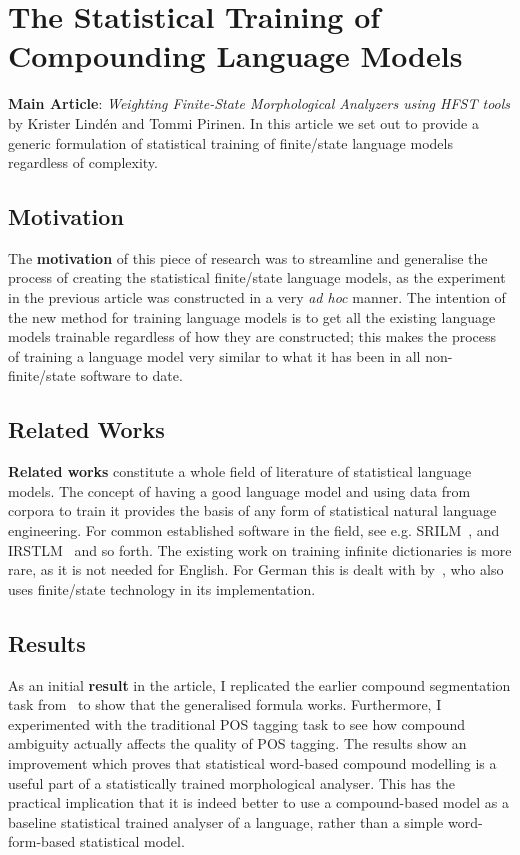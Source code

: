 \documentclass[officiallayout,final]{unihelcompling}
\begin{document}
\section{The Statistical Training of Compounding Language Models}
\label{sec:training-compounds}

\textbf{Main Article}: \emph{Weighting Finite-State Morphological Analyzers
using HFST tools} by Krister Lindén and Tommi Pirinen. In this article we set out
to provide a generic formulation of statistical training of finite\-/state
language models regardless of complexity.

\subsection{Motivation}

The \textbf{motivation} of this piece of research was to streamline and
generalise the process of creating the statistical finite\-/state language
models, as the experiment in the previous article
 was constructed in a very \emph{ad hoc}
manner. The intention of the new method for training language models is to get
all the existing language models trainable regardless of how they are
constructed; this makes the process of training a language model very similar
to what it has been in all non-finite\-/state software to date.

\subsection{Related Works}

\textbf{Related works} constitute a whole field of literature of statistical
language models. The concept of having a good language model and using data
from corpora to train it provides the basis of any form of statistical natural
language engineering. For common established software in the field, see e.g.
SRILM~\citep{stolcke2002srilm}, and IRSTLM~\citep{federico2008irstlm} and so
forth.  The existing work on training infinite dictionaries is more rare, as it
is not needed for English. For German this is dealt with
by~\citet{schiller2006german}, who also uses finite\-/state technology in its
implementation.

\subsection{Results}

As an initial \textbf{result} in the article, I replicated the earlier compound
segmentation task from~ to show that the generalised formula works.
Furthermore, I experimented with the traditional POS tagging task to see how
compound ambiguity actually affects the quality of POS tagging. The results
show an improvement which proves that statistical word-based compound
modelling is a useful part of a statistically trained morphological
analyser. This has the practical implication that it is indeed better to
use a compound-based model as a baseline statistical trained analyser
of a language, rather than a simple word-form-based statistical model.
\end{document}
